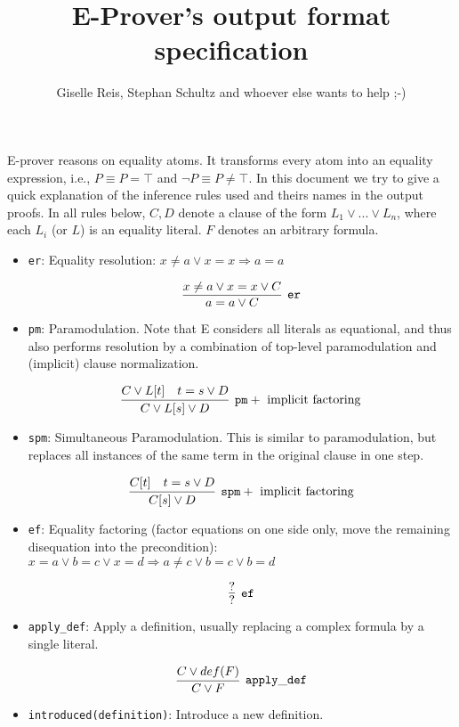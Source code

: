 \documentclass[a4paper, 11pt]{article}
\title{E-Prover's output format specification}
\author{Giselle Reis, Stephan Schultz and whoever
else wants to help ;-)}
\begin{document}
\maketitle

E-prover reasons on equality atoms. It transforms every atom into an equality
expression, i.e., $P \equiv P = \top$ and $\neg P \equiv P \neq \top$.
%
In this document we try to give a quick explanation of the inference rules used
and theirs names in the output proofs. In all rules below, $C, D$ denote a
clause of the form $L_1 \vee ... \vee L_n$, where each $L_i$ (or $L$) is an
equality literal. $F$ denotes an arbitrary formula.

\begin{itemize}
\item \texttt{er}: 
  Equality resolution: $x \neq a \vee x = x \Rightarrow a = a$

  \[
  \infer[\mathtt{er}]{a = a \vee C}{x \neq a \vee x = x \vee C}
  \]

\item \texttt{pm}: 
  Paramodulation. Note that E considers all literals as
  equational, and thus also performs resolution by a combination of top-level
  paramodulation and (implicit) clause normalization.

  \[
  \infer[\mathtt{pm} + \mbox{ implicit factoring}]{C \vee L[s] \vee D}{
    C \vee L[t] &
    t = s \vee D
  }
  \]

\item \texttt{spm}: 
  Simultaneous Paramodulation. This is similar to
  paramodulation, but replaces all instances of the same term in the original
  clause in one step.

  \[
  \infer[\mathtt{spm} + \mbox{ implicit factoring}]{C[s] \vee D}{
    C[t] &
    t = s \vee D
  }
  \]

\item \texttt{ef}: 
  Equality factoring (factor equations on one side only, move
  the remaining disequation into the precondition): 
  \newline
  $x = a \vee b = c \vee x = d \Rightarrow a \neq c \vee b = c \vee b = d$

  \[
  \infer[\mathtt{ef}]{?}{?}
  \]

\item \texttt{apply\_def}: 
  Apply a definition, usually replacing a complex
  formula by a single literal.

  \[
  \infer[\mathtt{apply\_def}]{C \vee F}{
    C \vee def(F)
  }
  \]

\item \texttt{introduced(definition)}: 
  Introduce a new definition.


\end{itemize}
\end{document}

